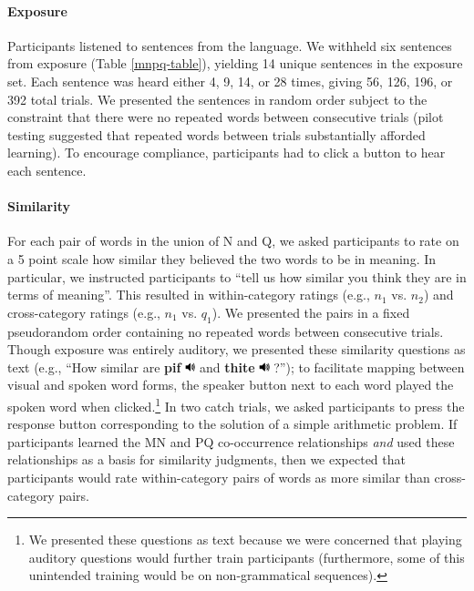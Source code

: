\documentclass[man,longtable, floatmark]{my-apa6}
\begin{document}
\paragraph{Exposure}
Participants listened to sentences from the language. We withheld six sentences from exposure (Table \ref{mnpq-table}), yielding 14 unique sentences in the exposure set. Each sentence was heard either 4, 9, 14, or 28 times, giving 56, 126, 196, or 392 total trials. We presented the sentences in random order subject to the constraint that there were no repeated words between consecutive trials (pilot testing suggested that repeated words between trials substantially afforded learning). To encourage compliance, participants had to click a button to hear each sentence.

\paragraph{Similarity}
For each pair of words in the union of N and Q, we asked participants to rate on a 5 point scale how similar they believed the two words to be in meaning. In particular, we instructed participants to  ``tell us how similar you think they are in terms of meaning''. This resulted in within-category ratings (e.g., $n_1$ vs. $n_2$) and cross-category ratings (e.g., $n_1$ vs. $q_1$). We presented the pairs in a fixed pseudorandom order containing no repeated words between consecutive trials. Though exposure was entirely auditory, we presented these similarity questions as text (e.g., ``How similar are \textbf{pif} \includegraphics[width=0.3cm]{play.png} and \textbf{thite} \includegraphics[width=0.3cm]{play.png} ?''); to facilitate mapping between visual and spoken word forms, the speaker button next to each word played the spoken word when clicked.\footnote{ We presented these questions as text because we were concerned that playing auditory questions would further train participants (furthermore, some of this unintended training would be on non-grammatical sequences).} In two catch trials, we asked participants to press the response button corresponding to the solution of a simple arithmetic problem. If participants learned the MN and PQ co-occurrence relationships \emph{and} used these relationships as a basis for similarity judgments, then we expected that participants would rate within-category pairs of words as more similar than cross-category pairs.
\end{document}
